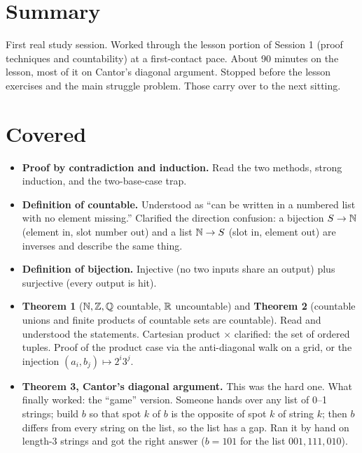 \documentclass[11pt]{article}
\begin{document}

\section*{Summary}
First real study session. Worked through the lesson portion of Session 1 (proof techniques and countability) at a first-contact pace. About 90 minutes on the lesson, most of it on Cantor's diagonal argument. Stopped before the lesson exercises and the main struggle problem. Those carry over to the next sitting.

\section*{Covered}
\begin{itemize}
  \item \textbf{Proof by contradiction and induction.} Read the two methods, strong induction, and the two-base-case trap.
  \item \textbf{Definition of countable.} Understood as ``can be written in a numbered list with no element missing.'' Clarified the direction confusion: a bijection $S \to \mathbb{N}$ (element in, slot number out) and a list $\mathbb{N} \to S$ (slot in, element out) are inverses and describe the same thing.
  \item \textbf{Definition of bijection.} Injective (no two inputs share an output) plus surjective (every output is hit).
  \item \textbf{Theorem 1} ($\mathbb{N}, \mathbb{Z}, \mathbb{Q}$ countable, $\mathbb{R}$ uncountable) and \textbf{Theorem 2} (countable unions and finite products of countable sets are countable). Read and understood the statements. Cartesian product $\times$ clarified: the set of ordered tuples. Proof of the product case via the anti-diagonal walk on a grid, or the injection $(a_i, b_j) \mapsto 2^i 3^j$.
  \item \textbf{Theorem 3, Cantor's diagonal argument.} This was the hard one. What finally worked: the ``game'' version. Someone hands over any list of 0--1 strings; build $b$ so that spot $k$ of $b$ is the opposite of spot $k$ of string $k$; then $b$ differs from every string on the list, so the list has a gap. Ran it by hand on length-3 strings and got the right answer ($b = 101$ for the list $001, 111, 010$).
\end{itemize}
\end{document}
